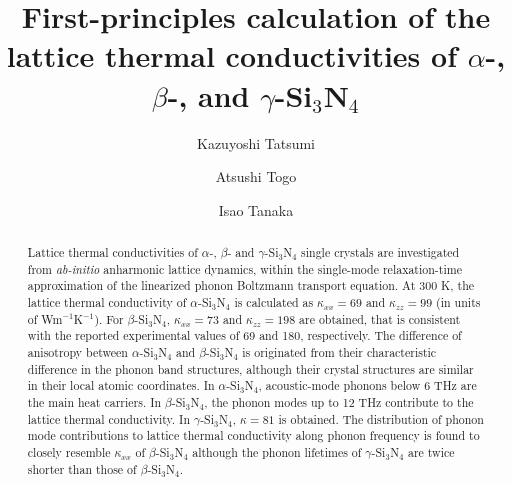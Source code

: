 \documentclass[twocolumn,amsmath,amssymb,a4paper,prb,superscriptaddress,floatfix]{revtex4-1}
\begin{document}
\title{First-principles calculation of the lattice thermal
conductivities of $\alpha$-, $\beta$-, and $\gamma$-Si$_3$N$_4$}

\author{Kazuyoshi Tatsumi} 

\author{Atsushi Togo}

\author{Isao Tanaka}

\begin{abstract}
Lattice thermal conductivities of $\alpha$-, $\beta$- and
$\gamma$-Si$_3$N$_4$ single crystals are investigated from {\it
ab-initio} anharmonic lattice dynamics, within the single-mode
relaxation-time approximation of the linearized phonon Boltzmann
transport equation. At 300 K, the lattice thermal conductivity of
$\alpha$-Si$_3$N$_4$ is calculated as $\kappa_{xx}=69$ and
$\kappa_{zz}=99$ (in units of Wm$^{-1}$K$^{-1}$). For
$\beta$-Si$_3$N$_4$, $\kappa_{xx}=73$ and $\kappa_{zz}=198$ are
obtained, that is consistent with the reported experimental values of 69
and 180, respectively. The difference of anisotropy between
$\alpha$-Si$_3$N$_4$ and $\beta$-Si$_3$N$_4$ is originated from their
characteristic difference in the phonon band structures, although their
crystal structures are similar in their local atomic coordinates. In
$\alpha$-Si$_3$N$_4$, acoustic-mode phonons below 6 THz are the main
heat carriers. In $\beta$-Si$_3$N$_4$, the phonon modes up to 12 THz
contribute to the lattice thermal conductivity.
%
In $\gamma$-Si$_3$N$_4$, $\kappa=81$ is obtained. The distribution of
phonon mode contributions to lattice thermal conductivity along phonon
frequency is found to closely resemble $\kappa_{xx}$ of
$\beta$-Si$_3$N$_4$ although the phonon lifetimes of
$\gamma$-Si$_3$N$_4$ are twice shorter than those of $\beta$-Si$_3$N$_4$.
\end{abstract}
\end{document}
